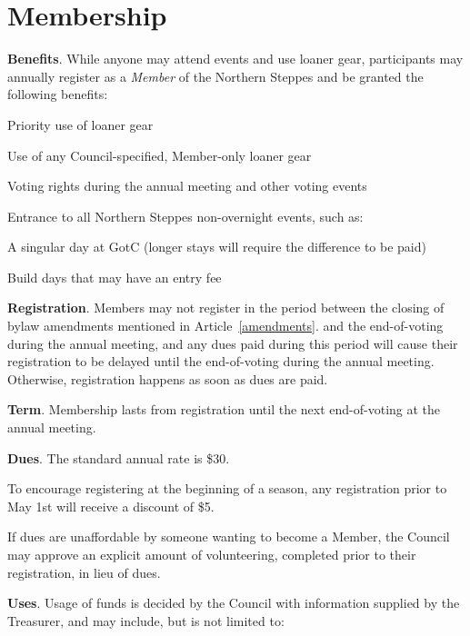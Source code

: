 \documentclass[12pt]{article}
\begin{document}
\section{Membership}
\begin{level}
    \item \textbf{Benefits}. While anyone may attend events and use loaner gear, participants may annually register as a \emph{Member} of the Northern Steppes and be granted the following benefits:
    \begin{level}
        \item Priority use of loaner gear
        \item Use of any Council-specified, Member-only loaner gear
        \item Voting rights during the annual meeting and other voting events
        \item Entrance to all Northern Steppes non-overnight events, such as:
        \begin{level}
            \item A singular day at GotC (longer stays will require the difference to be paid)
            \item Build days that may have an entry fee
        \end{level}
    \end{level}
    \item \textbf{Registration}. Members may not register in the period between the closing of bylaw amendments mentioned in Article~\ref{amendments}. and the end-of-voting during the annual meeting, and any dues paid during this period will cause their registration to be delayed until the end-of-voting during the annual meeting. Otherwise, registration happens as soon as dues are paid.
    \item \textbf{Term}. Membership lasts from registration until the next end-of-voting at the annual meeting. 
    \item \textbf{Dues}. The standard annual rate is \$30.
    \begin{level}
        \item To encourage registering at the beginning of a season, any registration prior to May 1st will receive a discount of \$5. 
        \item If dues are unaffordable by someone wanting to become a Member, the Council may approve an explicit amount of volunteering, completed prior to their registration, in lieu of dues.
    \end{level}
    \item \textbf{Uses}. Usage of funds is decided by the Council with information supplied by the Treasurer, and may include, but is not limited to:

\end{level}
\end{document}
